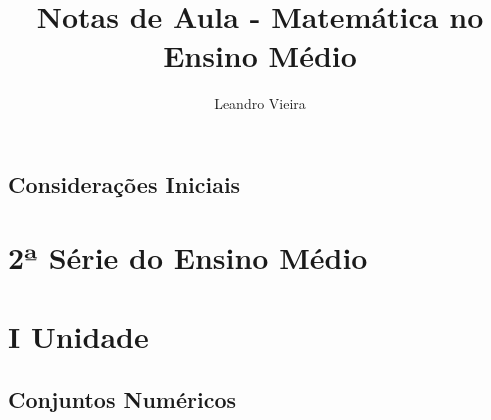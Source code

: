 \documentclass[12pt,a4paper]{book}
\author{Leandro Vieira}
\title{Notas de Aula - Matemática no Ensino Médio}
\begin{document}
\maketitle
\tableofcontents

\chapter{Considerações Iniciais}







\part{2ª Série do Ensino Médio}

\part*{I Unidade}

\chapter{Conjuntos Numéricos}
\end{document}
